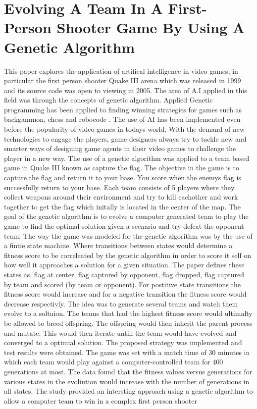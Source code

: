 \documentclass[12pt]{article} %
\begin{document}
\newpage
\section{Evolving A Team In A First-Person Shooter Game By Using A Genetic Algorithm} %
This paper explores the application of artifical intelligence in video games, in particular the first person shooter Quake III arena which was released in 1999 and its source code was open to viewing in 2005. The area of A.I applied in this field was through the concepts of genetic algorithm. Applied Genetic programming has been applied to finding winning strategies for games such as backgammon, chess and robocode \cite{Sipper}. The use of AI has been implemented even before the popularity of video games in todays world. With the demand of new technologies to engage the players, game designers always try to tackle new and smarter ways of designing game agents in their video games to challenge the player in a new way. The use of a genetic algorithm was applied to a team based game in Quake III known as capture the flag. The objective in the game is to capture the flag and return it to your base. You score when the enemys flag is successfully return to your base. Each team consists of 5 players where they collect weapons around their environment and try to kill eachother and work together to get the flag which initally is located in the center of the map. The goal of the genetic algorithm is to evolve a computer generated team to play the game to find the optimal solution given a scenario and try defeat the opponent team. The way the game was modeled for the genetic algorithm was by the use of a fintie state machine. Where transitions between states would determine a fitness score to be correleated by the genetic algorithm in order to score it self on how well it approaches a solution for a given situation. The paper defines these states as, flag at center, flag captured by opponent, flag dropped, flag captured by team and scored (by team or opponent). For postitive state transitions the fitness score would increase and for a negative transition the fitness score would decrease respectivly. The idea was to generate several teams and watch them evolve to a soltuion. The teams that had the highest fitness score would ultimalty be allowed to breed offspring. The offspring would then inherit the parent process and mutate. This would then iterate untill the team would have evolved and converged to a optimial solution. The proposed strategy was implemented and test results were obtained. The game was set with a match time of 30 minutes in which each team would play against a computer-controlled team for 400 generations at most. The data found that the fitness values versus generations for various states in the evoliution would increase with the number of generations in all states. The study provided an intersting approach using a genetic algorithm to allow a computer team to win in a complex first person shooter 
\end{document}
